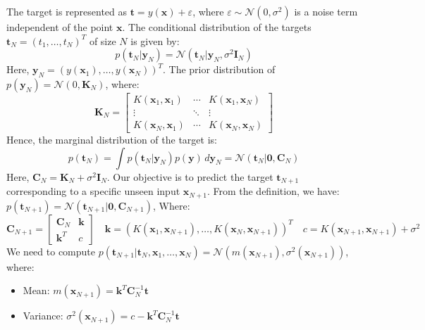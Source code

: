 The target is represented as $\mathbf{t} = y(\mathbf{x}) + \varepsilon$, where $\varepsilon \sim \mathcal{N} (0, \sigma^2)$ is a noise term independent of the point $\mathbf{x}$.
The conditional distribution of the targets $\mathbf{t}_N = (t_1,\ldots, t_N )^T$ of size $N$ is given by:
\[p(\mathbf{t}_N|\mathbf{y}_N)=\mathcal{N}(\mathbf{t}_N|\mathbf{y}_N,\sigma^2\mathbf{I}_N)\]
Here, $\mathbf{y}_N=(y(\mathbf{x}_1),\ldots,y(\mathbf{x}_N))^T$.
The prior distribution of $p(\mathbf{y}_N)=\mathcal{N}(0,\mathbf{K}_N)$, where:
\[\mathbf{K}_N=\begin{bmatrix}
    K(\mathbf{x}_1,\mathbf{x}_1) & \cdots & K(\mathbf{x}_1,\mathbf{x}_N) \\
    \vdots & \ddots & \vdots \\
    K(\mathbf{x}_N,\mathbf{x}_1) & \cdots & K(\mathbf{x}_N,\mathbf{x}_N)
\end{bmatrix}\]
Hence, the marginal distribution of the target is:
\[p(\mathbf{t}_N)=\int p(\mathbf{t}_N|\mathbf{y}_N)p(\mathbf{y})\,d\mathbf{y}_N=\mathcal{N}(\mathbf{t}_N|\mathbf{0},\mathbf{C}_N)\]
Here, $\mathbf{C}_N=\mathbf{K}_N+\sigma^2\mathbf{I}_N$.
Our objective is to predict the target $\mathbf{t}_{N+1}$ corresponding to a specific unseen input $\mathbf{x}_{N+1}$.
From the definition, we have:
$p(\mathbf{t}_{N+1}) = \mathcal{N} (\mathbf{t}_{N+1}|\mathbf{0}, \mathbf{C}_{N+1})$,
Where:
\[\mathbf{C}_{N+1}=\begin{bmatrix}
    \mathbf{C}_{N} & \mathbf{k} \\
    \mathbf{k}^T & c
\end{bmatrix} \quad \mathbf{k}=(K(\mathbf{x}_1,\mathbf{x}_{N+1}),\ldots,K(\mathbf{x}_N,\mathbf{x}_{N+1}))^T \quad c=K(\mathbf{x}_{N+1},\mathbf{x}_{N+1})+\sigma^2\]
We need to compute $p(\mathbf{t}_{N+1}|\mathbf{t}_N , \mathbf{x}_1,\ldots,\mathbf{x}_N) = \mathcal{N} (m(\mathbf{x}_{N+1}), \sigma^2(\mathbf{x}_{N+1}))$, where: 
\begin{itemize}
    \item Mean: $m(\mathbf{x}_{N+1}) = \mathbf{k}^T\mathbf{C}_N^{-1}\mathbf{t}$
    \item Variance: $\sigma^2(\mathbf{x}_{N+1}) = c -\mathbf{k}^T\mathbf{C}_N^{-1}\mathbf{t}$
\end{itemize}

